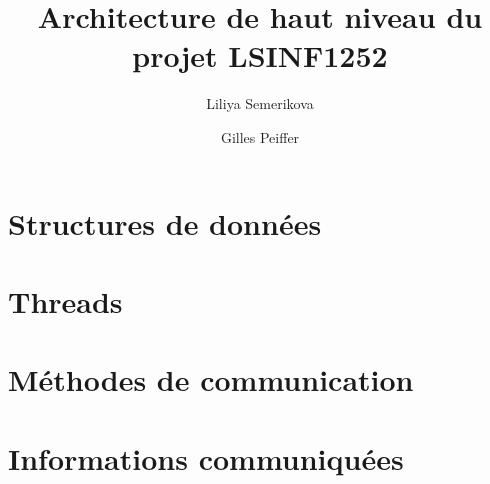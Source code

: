 \documentclass{article}
\title{Architecture de haut niveau du projet LSINF1252}
\author{Liliya Semerikova \and Gilles Peiffer}
\begin{document}
\date{\mydate}
\maketitle

\section{Structures de données}

\section{Threads}

\section{Méthodes de communication}

\section{Informations communiquées}
\end{document}
